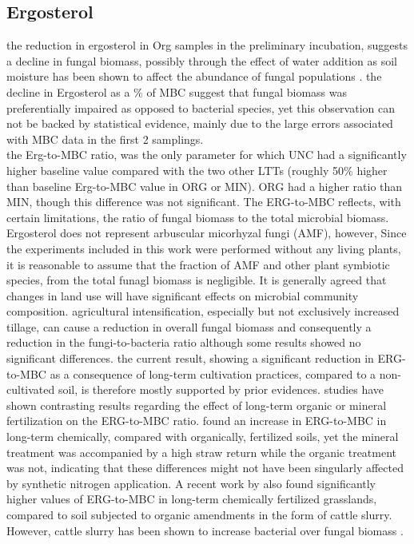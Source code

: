 	\subsection{Ergosterol}
	the reduction in ergosterol in Org samples in the preliminary incubation, suggests a decline in fungal biomass, possibly through the effect of water addition as soil moisture has been shown to affect the abundance of fungal populations \citep{drenovsky2004, griffin1963}. the decline in Ergosterol as a \% of MBC suggest that fungal biomass was preferentially impaired as opposed to bacterial species, yet this observation can not be backed by statistical evidence, mainly due to the large errors associated with MBC data in the first 2 samplings.\\
	the Erg-to-MBC ratio, was the only parameter for which UNC had a significantly higher baseline value compared with the two other LTTs (roughly 50\% higher than baseline Erg-to-MBC value in ORG or MIN).
	ORG had a higher ratio than MIN, though this difference was not significant. The ERG-to-MBC reflects, with certain limitations, the ratio of fungal biomass to the total microbial biomass. Ergosterol does not represent arbuscular micorhyzal fungi (AMF), however, Since the experiments included in this work were performed without any living plants, it is reasonable to assume that the fraction of AMF and other plant symbiotic species, from the total funagl biomass is negligible.
	It is generally agreed that changes in land use will have significant effects on microbial community composition\myRed{*}. agricultural intensification, especially but not exclusively increased tillage, can cause a reduction in overall fungal biomass and consequently a reduction in the fungi-to-bacteria ratio\myRed{*} although some results showed no significant differences\myRed{*}.
	the current result, showing a significant reduction in ERG-to-MBC as a consequence of long-term cultivation practices, compared to a non-cultivated soil, is therefore mostly supported by prior evidences.
	studies have shown contrasting results regarding the effect of long-term organic or mineral fertilization on the ERG-to-MBC ratio. \citet{heinze2010} found an increase in ERG-to-MBC in long-term chemically, compared with organically, fertilized soils, yet the mineral treatment was accompanied by a high straw return while the organic treatment was not, indicating that these differences might not have been  singularly affected by synthetic nitrogen application. A recent work by \citet{knoblauch2017} also found significantly higher values of ERG-to-MBC in long-term chemically fertilized grasslands, compared to soil subjected to organic amendments in the form of cattle slurry. However, cattle slurry has been shown to increase bacterial over fungal biomass \citet{knoblauch2017}.
